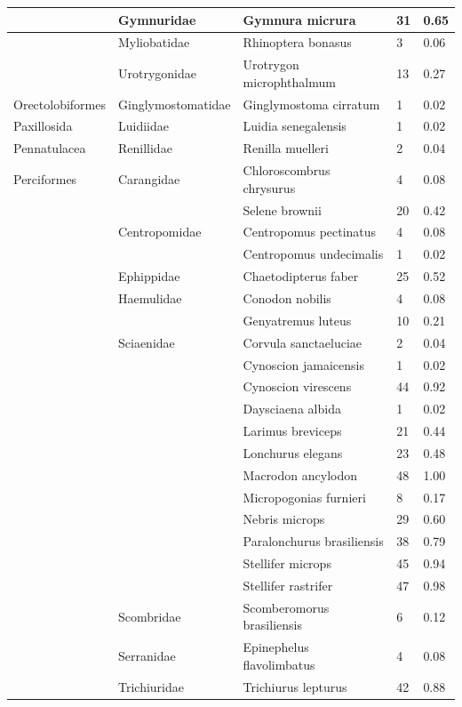 \documentclass[
]{book}
\begin{document}
\begin{table}
\begin{tabular}[t]{l|l|l|l|l}
\hline
 & Gymnuridae & Gymnura micrura & 31 & 0.65\\
\hline
 & Myliobatidae & Rhinoptera bonasus & 3 & 0.06\\
\hline
 & Urotrygonidae & Urotrygon microphthalmum & 13 & 0.27\\
\hline
Orectolobiformes & Ginglymostomatidae & Ginglymostoma cirratum & 1 & 0.02\\
\hline
Paxillosida & Luidiidae & Luidia senegalensis & 1 & 0.02\\
\hline
Pennatulacea & Renillidae & Renilla muelleri & 2 & 0.04\\
\hline
Perciformes & Carangidae & Chloroscombrus chrysurus & 4 & 0.08\\
\hline
 &  & Selene brownii & 20 & 0.42\\
\hline
 & Centropomidae & Centropomus pectinatus & 4 & 0.08\\
\hline
 &  & Centropomus undecimalis & 1 & 0.02\\
\hline
 & Ephippidae & Chaetodipterus faber & 25 & 0.52\\
\hline
 & Haemulidae & Conodon nobilis & 4 & 0.08\\
\hline
 &  & Genyatremus luteus & 10 & 0.21\\
\hline
 & Sciaenidae & Corvula sanctaeluciae & 2 & 0.04\\
\hline
 &  & Cynoscion jamaicensis & 1 & 0.02\\
\hline
 &  & Cynoscion virescens & 44 & 0.92\\
\hline
 &  & Daysciaena albida & 1 & 0.02\\
\hline
 &  & Larimus breviceps & 21 & 0.44\\
\hline
 &  & Lonchurus elegans & 23 & 0.48\\
\hline
 &  & Macrodon ancylodon & 48 & 1.00\\
\hline
 &  & Micropogonias furnieri & 8 & 0.17\\
\hline
 &  & Nebris microps & 29 & 0.60\\
\hline
 &  & Paralonchurus brasiliensis & 38 & 0.79\\
\hline
 &  & Stellifer microps & 45 & 0.94\\
\hline
 &  & Stellifer rastrifer & 47 & 0.98\\
\hline
 & Scombridae & Scomberomorus brasiliensis & 6 & 0.12\\
\hline
 & Serranidae & Epinephelus flavolimbatus & 4 & 0.08\\
\hline
 & Trichiuridae & Trichiurus lepturus & 42 & 0.88\\

\end{tabular}
\end{table}
\end{document}
